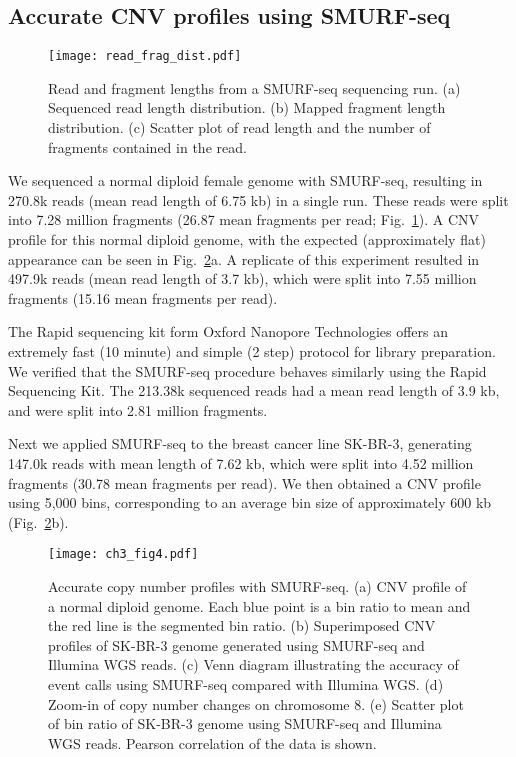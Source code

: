 \subsection{Accurate CNV profiles using SMURF-seq}
\begin{figure}[b!]
\centering
\texttt{[image: read\_frag\_dist.pdf]}
\caption[Read and fragment lengths from a SMURF-seq sequencing run.]{
  Read and fragment lengths from a SMURF-seq sequencing run.
  (a) Sequenced read length distribution.
  (b) Mapped fragment length distribution.
  (c) Scatter plot of read length and the number of fragments contained
  in the read.}
\label{read_frag_dist}
\end{figure}

We sequenced a normal diploid female genome with SMURF-seq, resulting in
270.8k reads (mean read length of 6.75 kb) in a single run. These reads
were split into 7.28 million fragments (26.87 mean fragments per read;
Fig.~\ref{read_frag_dist}).
A CNV profile for this normal diploid genome, with the expected
(approximately flat) appearance can be seen in Fig.~\ref{cnv}a.
A replicate of this experiment resulted in 497.9k reads (mean read
length of 3.7 kb), which were split into 7.55 million fragments (15.16
mean fragments per read).

The Rapid sequencing kit form Oxford Nanopore Technologies offers an
extremely fast (10 minute) and simple (2 step) protocol for library
preparation. We verified that the SMURF-seq procedure behaves similarly
using the Rapid Sequencing Kit. The 213.38k sequenced reads had a mean
read length of 3.9 kb, and were split into 2.81 million fragments.

Next we applied SMURF-seq to the breast cancer line SK-BR-3, generating
147.0k reads with mean length of 7.62 kb, which were split into 4.52
million fragments (30.78 mean fragments per read). We then obtained a
CNV profile using 5,000 bins, corresponding to an average bin size of
approximately 600 kb (Fig.~\ref{cnv}b).

\begin{figure}[b!]
\centering
\texttt{[image: ch3\_fig4.pdf]}
\caption[Accurate copy number profiles with SMURF-seq.]{
  Accurate copy number profiles with SMURF-seq.
  (a) CNV profile of a normal diploid genome. Each blue point is a
  bin ratio to mean and the red line is the segmented bin ratio.
  (b) Superimposed CNV profiles of SK-BR-3 genome generated using
  SMURF-seq and Illumina WGS reads.
  (c) Venn diagram illustrating the accuracy of event calls using
  SMURF-seq compared with Illumina WGS.
  (d) Zoom-in of copy number changes on chromosome 8.
  (e) Scatter plot of bin ratio of SK-BR-3 genome using
  SMURF-seq and Illumina WGS reads. Pearson correlation of the data
  is shown.}
\label{cnv}
\end{figure}

